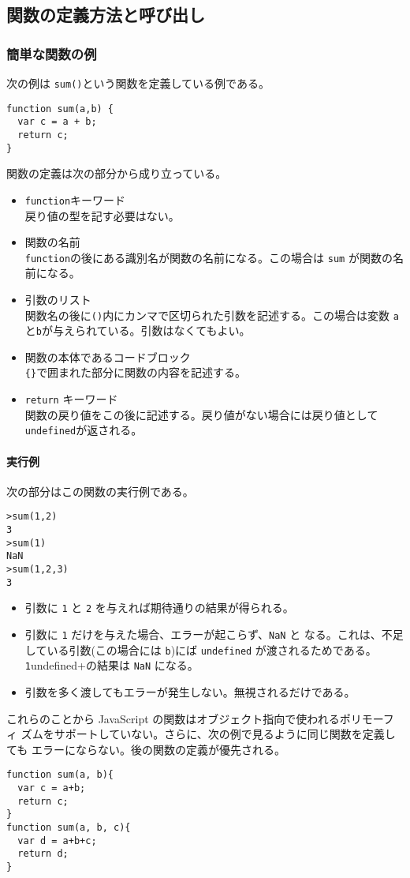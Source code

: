 \documentclass[a4j]{jarticle}
\begin{document}
\subsection{関数の定義方法と呼び出し}
\subsubsection{簡単な関数の例}
次の例は \verb+sum()+という関数を定義している例である。
\begin{Verbatim}
function sum(a,b) {
  var c = a + b;
  return c;
}
\end{Verbatim}
関数の定義は次の部分から成り立っている。
\begin{itemize}
 \item \verb+function+キーワード\\
戻り値の型を記す必要はない。
 \item 関数の名前\\
\verb+function+の後にある識別名が関数の名前になる。この場合は \verb+sum+
       が関数の名前になる。
 \item 引数のリスト\\
関数名の後に\verb+()+内にカンマで区切られた引数を記述する。この場合は変数
       \verb+a+と\verb+b+が与えられている。引数はなくてもよい。
 \item 関数の本体であるコードブロック\\
\verb+{}+で囲まれた部分に関数の内容を記述する。
\item \verb+return+ キーワード\\
関数の戻り値をこの後に記述する。戻り値がない場合には戻り値として
       \verb+undefined+が返される。
\end{itemize}
\paragraph{実行例}
次の部分はこの関数の実行例である。
\begin{Verbatim}
>sum(1,2)
3
>sum(1)
NaN
>sum(1,2,3)
3
\end{Verbatim} 
\begin{itemize}
 \item 引数に \verb+1+ と \verb+2+ を与えれば期待通りの結果が得られる。
 \item 引数に \verb+1+ だけを与えた場合、エラーが起こらず、\verb+NaN+ と
       なる。これは、不足している引数(この場合には \verb+b+)にば
       \verb+undefined+ が渡されるためである。\verb+1+undefined+の結果は
       \verb+NaN+ になる。
 \item 引数を多く渡してもエラーが発生しない。無視されるだけである。
\end{itemize}
これらのことから JavaScript の関数はオブジェクト指向で使われるポリモーフィ
ズムをサポートしていない。さらに、次の例で見るように同じ関数を定義しても
エラーにならない。後の関数の定義が優先される。
\begin{Verbatim}
function sum(a, b){
  var c = a+b;
  return c;
}
function sum(a, b, c){
  var d = a+b+c;
  return d;
}
\end{Verbatim}
\end{document}
